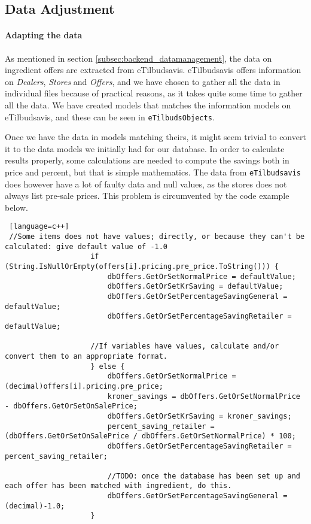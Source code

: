 \subsection{Data Adjustment}
\label{subsec:dataadjustment}

\paragraph{Adapting the data}
As mentioned in section \ref{subsec:backend_datamanagement}, the data on ingredient offers are extracted from eTilbudsavis. eTilbudsavis offers information on \textit{Dealers}, \textit{Stores} and \textit{Offers}, and we have chosen to gather all the data in individual files because of practical reasons, as it takes quite some time to gather all the data. We have created models that matches the information models on eTilbudsavis, and these can be seen in \texttt{eTilbudsObjects}.

Once we have the data in models matching theirs, it might seem trivial to convert it to the data models we initially had for our database. In order to calculate results properly, some calculations are needed to compute the savings both in price and percent, but that is simple mathematics. The data from \texttt{eTilbudsavis} does however have a lot of faulty data and null values, as the stores does not always list pre-sale prices. This problem is circumvented by the code example below.

\begin{lstlisting} [language=c++]
 //Some items does not have values; directly, or because they can't be calculated: give default value of -1.0
                    if (String.IsNullOrEmpty(offers[i].pricing.pre_price.ToString())) {
                        dbOffers.GetOrSetNormalPrice = defaultValue;
                        dbOffers.GetOrSetKrSaving = defaultValue;
                        dbOffers.GetOrSetPercentageSavingGeneral = defaultValue;
                        dbOffers.GetOrSetPercentageSavingRetailer = defaultValue;

                    //If variables have values, calculate and/or convert them to an appropriate format.
                    } else {
                        dbOffers.GetOrSetNormalPrice = (decimal)offers[i].pricing.pre_price;
                        kroner_savings = dbOffers.GetOrSetNormalPrice - dbOffers.GetOrSetOnSalePrice;
                        dbOffers.GetOrSetKrSaving = kroner_savings;
                        percent_saving_retailer = (dbOffers.GetOrSetOnSalePrice / dbOffers.GetOrSetNormalPrice) * 100;
                        dbOffers.GetOrSetPercentageSavingRetailer = percent_saving_retailer;

                        //TODO: once the database has been set up and each offer has been matched with ingredient, do this.
                        dbOffers.GetOrSetPercentageSavingGeneral = (decimal)-1.0;
                    }
\end{lstlisting}

